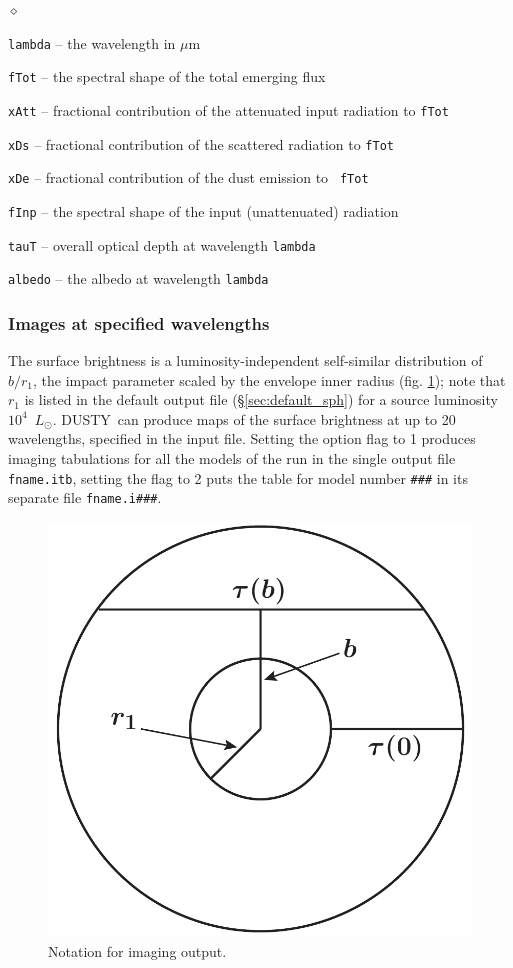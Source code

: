 \documentclass[11pt]{article}
\def\D    {{\sf DUSTY}}
\def\E#1{\hbox{$10^{#1}$}}
\def\mic    {\hbox{$\mu$m}}
\def\Lo     {\hbox{$L_{\odot}$}}
\begin{document}
\begin{list}{$\diamond$}{}
\item {\tt lambda} -- the wavelength in \mic
\item {\tt fTot} -- the spectral shape of the total emerging flux
\item{\tt xAtt} -- fractional contribution of the attenuated input
  radiation to {\tt fTot}
\item{\tt xDs} -- fractional contribution of the scattered radiation
  to {\tt fTot}
\item{\tt xDe} -- fractional contribution of the dust emission to {\tt
    fTot}
\item{\tt fInp} -- the spectral shape of the input (unattenuated)
  radiation
\item{\tt tauT} -- overall optical depth at wavelength {\tt lambda}
\item{\tt albedo} -- the albedo at wavelength {\tt lambda}
\end{list}

\subsubsection{Images at specified wavelengths}
\label{sec:images_sph}

The surface brightness is a luminosity-independent self-similar
distribution \cite{IE96a} of $b/r_1$, the impact parameter scaled by
the envelope inner radius (fig. \ref{impact parameter}); note that
$r_1$ is listed in the default output file (\S\ref{sec:default_sph})
for a source luminosity \E4~\Lo. \D\ can produce maps of the surface
brightness at up to 20 wavelengths, specified in the input
file. Setting the option flag to 1 produces imaging tabulations for
all the models of the run in the single output file {\tt fname.itb},
setting the flag to 2 puts the table for model number {\tt \#\#\#} in
its separate file {\tt fname.i\#\#\#}.

\begin{figure}[ht]
  \centering
  \includegraphics[width=0.40\hsize]{sphere}
  \caption{Notation for imaging output.}
  \label{impact parameter}
\end{figure}
\end{document}
